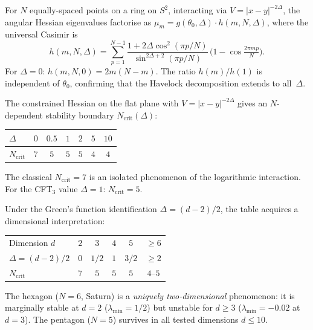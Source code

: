 \begin{proposition}
\label{prop:generalised-casimir}
For $N$ equally-spaced points on a ring on $S^2$,
interacting via $V = |x - y|^{-2\Delta}$,
the angular Hessian eigenvalues factorise as
$\mu_m = g(\theta_0, \Delta) \cdot h(m, N, \Delta)$,
where the universal Casimir is
\begin{equation}\label{eq:gen-casimir}
  h(m, N, \Delta) = \sum_{p=1}^{N-1}
    \frac{1 + 2\Delta\cos^2(\pi p/N)}
         {\sin^{2\Delta+2}(\pi p/N)}\,
    \bigl(1 - \cos\tfrac{2\pi mp}{N}\bigr).
\end{equation}
For $\Delta = 0$: $h(m, N, 0) = 2m(N{-}m)$.
The ratio $h(m)/h(1)$ is independent of $\theta_0$, confirming
that the Havelock decomposition extends to all~$\Delta$.
\end{proposition}

The constrained Hessian on the flat plane with $V = |x - y|^{-2\Delta}$
gives an $N$-dependent stability boundary $N_{\mathrm{crit}}(\Delta)$:

\begin{center}
\begin{tabular}{lcccccc}
\toprule
$\Delta$ & $0$ & $0.5$ & $1$ & $2$ & $5$ & $10$ \\
\midrule
$N_{\mathrm{crit}}$ & $7$ & $5$ & $5$ & $5$ & $4$ & $4$ \\
\bottomrule
\end{tabular}
\end{center}

The classical $N_{\mathrm{crit}} = 7$ is an isolated phenomenon
of the logarithmic interaction. For the CFT$_3$ value $\Delta = 1$:
$N_{\mathrm{crit}} = 5$.

Under the Green's function identification $\Delta = (d{-}2)/2$,
the table acquires a dimensional interpretation:
\begin{center}
\begin{tabular}{lccccc}
\toprule
Dimension $d$ & $2$ & $3$ & $4$ & $5$ & $\ge 6$ \\
$\Delta = (d{-}2)/2$ & $0$ & $1/2$ & $1$ & $3/2$ & $\ge 2$ \\
\midrule
$N_{\mathrm{crit}}$ & $7$ & $5$ & $5$ & $5$ & $4$--$5$ \\
\bottomrule
\end{tabular}
\end{center}
\noindent
The hexagon ($N = 6$, Saturn) is a \emph{uniquely two-dimensional}
phenomenon: it is marginally stable at $d = 2$ ($\lambda_{\min} = 1/2$)
but unstable for $d \ge 3$ ($\lambda_{\min} = -0.02$ at $d = 3$).
The pentagon ($N = 5$) survives in all tested dimensions $d \le 10$.

